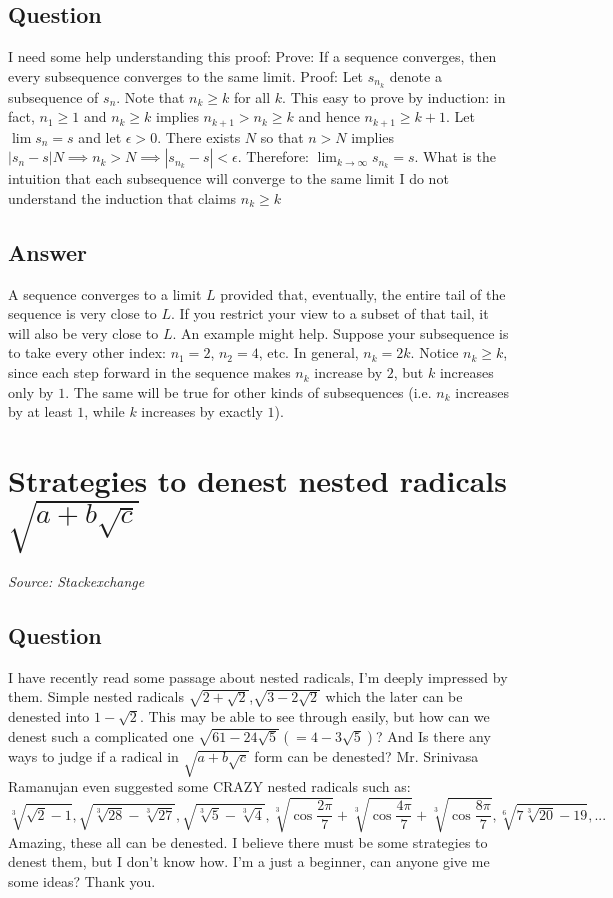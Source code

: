 \documentclass{article}
\begin{document}
\subsection*{Question}
I need some help understanding this proof: Prove: If a sequence converges, then every subsequence converges to the same limit. Proof: Let $s_{n_k}$ denote a subsequence of $s_n$. Note that $n_k \geq k$ for all $k$. This easy to prove by induction: in fact, $n_1 \geq 1$ and $n_k \geq k$ implies $n_{k+1} > n_k \geq k$ and hence $n_{k+1} \geq k+1$. Let $\lim s_n = s$ and let $\epsilon > 0$. There exists $N$ so that $n>N$ implies $|s_n - s|  N \implies n_k > N \implies |s_{n_k} - s| < \epsilon$. Therefore: $\lim_{k \to \infty} s_{n_k} = s$. What is the intuition that each subsequence will converge to the same limit I do not understand the induction that claims $n_k \geq k$

\subsection*{Answer}
A sequence converges to a limit $L$ provided that, eventually, the entire tail of the sequence is very close to $L$. If you restrict your view to a subset of that tail, it will also be very close to $L$. An example might help. Suppose your subsequence is to take every other index: $n_1 = 2$, $n_2 = 4$, etc. In general, $n_k = 2k$. Notice $n_k \geq k$, since each step forward in the sequence makes $n_k$ increase by $2$, but $k$ increases only by $1$. The same will be true for other kinds of subsequences (i.e. $n_k$ increases by at least $1$, while $k$ increases by exactly $1$).

\newpage

\section{Strategies to denest nested radicals $\sqrt{a+b\sqrt{c}}$}
\textit{Source: Stackexchange}

\subsection*{Question}
I have recently read some passage about nested radicals, I'm deeply impressed by them. Simple nested radicals $\sqrt{2+\sqrt{2}}$,$\sqrt{3-2\sqrt{2}}$ which the later can be denested into $1-\sqrt{2}$. This may be able to see through easily, but how can we denest such a complicated one $\sqrt{61-24\sqrt{5}}(=4-3\sqrt{5})$? And Is there any ways to judge if a radical in $\sqrt{a+b\sqrt{c}}$ form can be denested? Mr. Srinivasa Ramanujan even suggested some CRAZY nested radicals such as: $$\sqrt[3]{\sqrt{2}-1},\sqrt{\sqrt[3]{28}-\sqrt[3]{27}},\sqrt{\sqrt[3]{5}-\sqrt[3]{4}}, \sqrt[3]{\cos{\frac{2\pi}{7}}}+\sqrt[3]{\cos{\frac{4\pi}{7}}}+\sqrt[3]{\cos{\frac{8\pi}{7}}},\sqrt[6]{7\sqrt[3]{20}-19},...$$ Amazing, these all can be denested. I believe there must be some strategies to denest them, but I don't know how. I'm a just a beginner, can anyone give me some ideas? Thank you.
\end{document}
